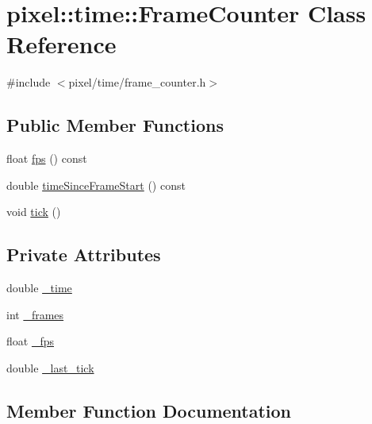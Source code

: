 \hypertarget{classpixel_1_1time_1_1_frame_counter}{}\section{pixel\+:\+:time\+:\+:Frame\+Counter Class Reference}
\label{classpixel_1_1time_1_1_frame_counter}


{\ttfamily \#include $<$pixel/time/frame\+\_\+counter.\+h$>$}

\subsection*{Public Member Functions}
\begin{DoxyCompactItemize}
\item 
float \hyperlink{classpixel_1_1time_1_1_frame_counter_a5b8d09dea6a20708807642b3c54b86b4}{fps} () const
\item 
double \hyperlink{classpixel_1_1time_1_1_frame_counter_a0facf7db680e8e8b3ee5d0166eef5081}{time\+Since\+Frame\+Start} () const
\item 
void \hyperlink{classpixel_1_1time_1_1_frame_counter_aebd4a5f0f6f0d504c7994a0a304eadda}{tick} ()
\end{DoxyCompactItemize}
\subsection*{Private Attributes}
\begin{DoxyCompactItemize}
\item 
double \hyperlink{classpixel_1_1time_1_1_frame_counter_ad61f85ae59992aa81095dc04e8550ef5}{\+\_\+time}
\item 
int \hyperlink{classpixel_1_1time_1_1_frame_counter_aee5fce15c13a96a901654c7bc3d36760}{\+\_\+frames}
\item 
float \hyperlink{classpixel_1_1time_1_1_frame_counter_a0a76fc8dbda143f183631f916be123fb}{\+\_\+fps}
\item 
double \hyperlink{classpixel_1_1time_1_1_frame_counter_aabf123f160b7e66fbeba02fd8216be47}{\+\_\+last\+\_\+tick}
\end{DoxyCompactItemize}


\subsection{Member Function Documentation}
\mbox{\label{classpixel_1_1time_1_1_frame_counter_a5b8d09dea6a20708807642b3c54b86b4}} 
